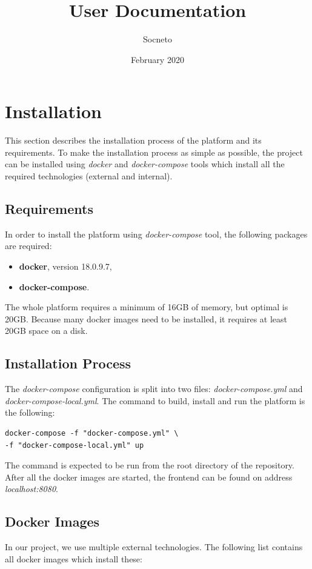 \documentclass{article}
\title{User Documentation}
\author{Socneto}
\date{February 2020}
\begin{document}
\maketitle

\section{Installation}\label{section:installation}
This section describes the installation process of the platform and its requirements. To make the installation process as simple as possible, the project can be installed using \textit{docker} and \textit{docker-compose} tools which install all the required technologies (external and internal).

\subsection{Requirements}
In order to install the platform using \textit{docker-compose} tool, the following packages are required:
\begin{itemize}
    \item \textbf{docker}, version 18.0.9.7,
    \item \textbf{docker-compose}.
\end{itemize}

The whole platform requires a minimum of 16GB of memory, but optimal is 20GB. Because many docker images need to be installed, it requires at least 20GB space on a disk.

\subsection{Installation Process}
The \textit{docker-compose} configuration is split into two files: \textit{docker-compose.yml} and \textit{docker-compose-local.yml}. The command to build, install and run the platform is the following:

\begin{lstlisting}[style=DOS]
docker-compose -f "docker-compose.yml" \
-f "docker-compose-local.yml" up
\end{lstlisting}

The command is expected to be run from the root directory of the repository. After all the docker images are started, the frontend can be found on address \textit{localhost:8080}.

\subsection{Docker Images}
In our project, we use multiple external technologies. The following list contains  all docker images which install these:
\end{document}
